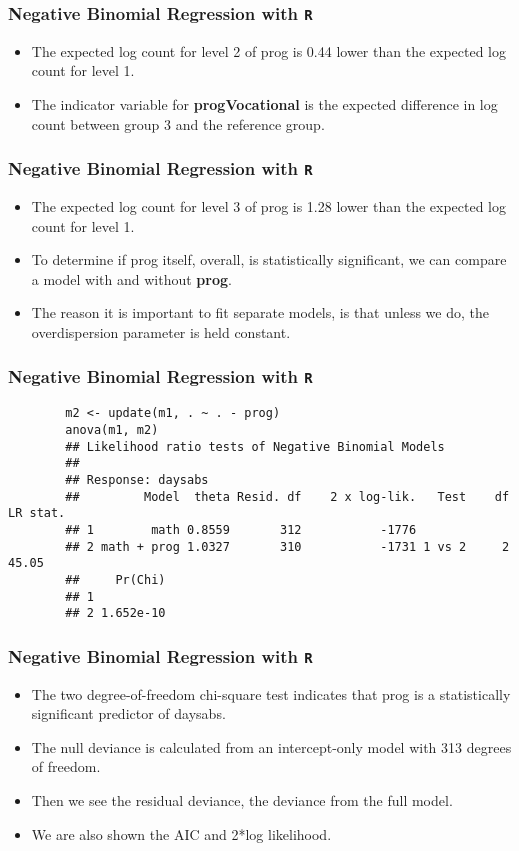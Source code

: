 \documentclass[MASTER.tex]{subfiles}
\begin{document}
\begin{frame}[fragile]
	\frametitle{Negative Binomial Regression with \texttt{R} }
	\Large
	\begin{itemize}
	\item 
	The expected log count for level 2 of prog is 0.44 lower than the expected log count for level 1. 
	\item The indicator variable for \textbf{progVocational} is the expected difference in log count between group 3 and
	the reference group.
	\end{itemize}
\end{frame}
\begin{frame}[fragile]
	\frametitle{Negative Binomial Regression with \texttt{R} }
	\Large
	\begin{itemize}	
	
	\item The expected log count for level 3 of prog is 1.28 lower than the expected log count for level 1. 
	\item To determine if prog itself, overall, is statistically significant, we can compare a model with and without \textbf{prog}. 
	\item The reason it is important to fit separate models, is that unless we do, the overdispersion parameter is held constant.
	\end{itemize}
\end{frame}
\begin{frame}[fragile]
	\frametitle{Negative Binomial Regression with \texttt{R} }

		\begin{verbatim}	
		m2 <- update(m1, . ~ . - prog)
		anova(m1, m2)
		## Likelihood ratio tests of Negative Binomial Models
		## 
		## Response: daysabs
		##         Model  theta Resid. df    2 x log-lik.   Test    df LR stat.
		## 1        math 0.8559       312           -1776                      
		## 2 math + prog 1.0327       310           -1731 1 vs 2     2    45.05
		##     Pr(Chi)
		## 1          
		## 2 1.652e-10
		\end{verbatim}
\end{frame}
\begin{frame}[fragile]
	\frametitle{Negative Binomial Regression with \texttt{R} }
	\Large
	
	\begin{itemize}
	\item The two degree-of-freedom chi-square test indicates that prog is a statistically significant predictor of daysabs.
	\item The null deviance is calculated from an intercept-only model with 313 degrees of freedom. 
	\item Then we see the residual deviance, the deviance from the full model. 
	\item We are also shown the AIC and 2*log likelihood.
\end{itemize}
\end{frame}
\end{document}
